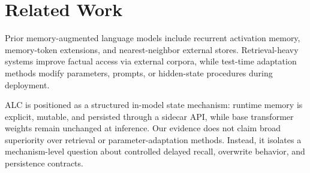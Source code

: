 \section{Related Work}
Prior memory-augmented language models include recurrent activation memory, memory-token extensions, and nearest-neighbor external stores. Retrieval-heavy systems improve factual access via external corpora, while test-time adaptation methods modify parameters, prompts, or hidden-state procedures during deployment.

ALC is positioned as a structured in-model state mechanism: runtime memory is explicit, mutable, and persisted through a sidecar API, while base transformer weights remain unchanged at inference. Our evidence does not claim broad superiority over retrieval or parameter-adaptation methods. Instead, it isolates a mechanism-level question about controlled delayed recall, overwrite behavior, and persistence contracts.

